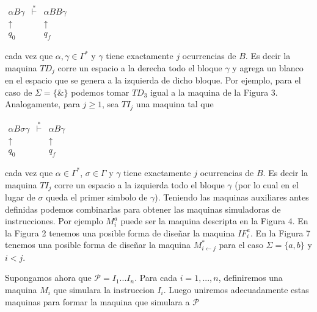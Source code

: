   $\displaystyle \begin{array}{ccc} \alpha B\gamma & \overset{\ast }{\vdash } & \alpha BB\gamma \\ \uparrow & & \uparrow \ \ \\ q_{0} & & q_{f}\ \ \end{array} $

  cada vez que $\alpha ,\gamma \in \Gamma ^{\ast }$ y $\gamma $ tiene exactamente $j$ ocurrencias de $B$. Es decir la maquina $TD_{j}$ corre un espacio a la derecha todo el bloque $\gamma $ y agrega un blanco en el espacio que se genera a la izquierda de dicho bloque. Por ejemplo, para el caso de $\Sigma =\{\& \}$ podemos tomar $TD_{3}$ igual a la maquina de la Figura 3.
  Analogamente, para $j\geq 1$, sea $TI_{j}$ una maquina tal que

  $\displaystyle \begin{array}{ccc} \alpha B\sigma \gamma & \overset{\ast }{\vdash } & \alpha B\gamma \\ \uparrow \ & & \uparrow \\ q_{0}\ \ & & q_{f} \end{array} $

  cada vez que $\alpha \in \Gamma ^{\ast }$, $\sigma \in \Gamma $ y $\gamma $ tiene exactamente $j$ ocurrencias de $B$. Es decir la maquina $TI_{j}$ corre un espacio a la izquierda todo el bloque $\gamma $ (por lo cual en el lugar de $\sigma $ queda el primer simbolo de $\gamma $).
  Teniendo las maquinas auxiliares antes definidas podemos combinarlas para obtener las maquinas simuladoras de instrucciones. Por ejemplo $M_{i}^{a}$ puede ser la maquina descripta en la Figura 4. En la Figura 2 tenemos una posible forma de dise\~{n}ar la maquina $IF_{i}^{a}$. En la Figura 7 tenemos una posible forma de dise\~{n}ar la maquina $M_{i\leftarrow j}^{\ast }$ para el caso $\Sigma =\{a,b\}$ y $i< j$.

  Supongamos ahora que $\mathcal{P}=I_{1}...I_{n}$. Para cada $i=1,...,n$, definiremos una maquina $M_{i}$ que simulara la instruccion $I_{i}$. Luego uniremos adecuadamente estas maquinas para formar la maquina que simulara a $ \mathcal{P}$

